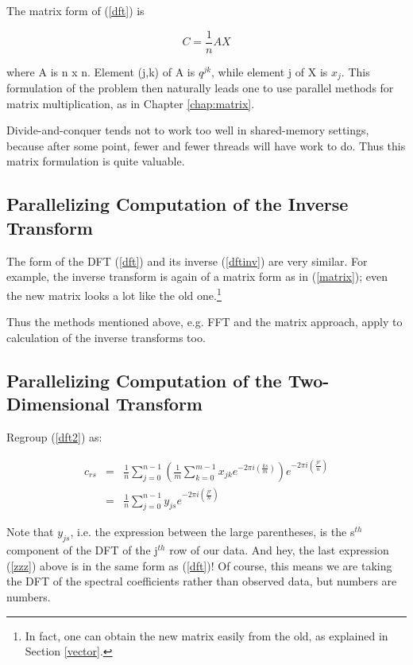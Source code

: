 The matrix form of (\ref{dft}) is

\begin{equation}
\label{matrix}
C = \frac{1}{n} A X
\end{equation}

where A is n x n.  Element (j,k) of A is $q^{jk}$, while
element j of X is $x_j$.  This formulation of the problem then naturally
leads one to use parallel methods for matrix multiplication, as in 
Chapter \ref{chap:matrix}.

Divide-and-conquer tends not to work too well in shared-memory settings,
because after some point, fewer and fewer threads will have work to do.
Thus this matrix formulation is quite valuable.

\subsection{Parallelizing Computation of the Inverse Transform}  

The form of the DFT (\ref{dft}) and its inverse (\ref{dftinv}) are very
similar.  For example, the inverse transform is again of a matrix form
as in (\ref{matrix}); even the new matrix looks a lot like the old 
one.\footnote{In fact, one can obtain the new matrix easily from the
old, as explained in Section \ref{vector}.}

Thus the methods mentioned above, e.g. FFT and the matrix approach,
apply to calculation of the inverse transforms too.

\subsection{Parallelizing Computation of the Two-Dimensional Transform}
\label{par2d}

Regroup (\ref{dft2}) as:

\begin{eqnarray}
\label{dft2new}
c_{rs} &=& 
\frac{1}{n} 
\sum_{j=0}^{n-1}
\left (
\frac{1}{m}
\sum_{k=0}^{m-1}
x_{jk} e^{-2\pi i(\frac{ks}{m})}
\right )
e^{-2\pi i(\frac{jr}{n})} \\
&=&
\label{zzz}
\frac{1}{n}
\sum_{j=0}^{n-1}
y_{js}
e^{-2\pi i(\frac{jr}{n})}
\end{eqnarray}

Note that $y_{js}$, i.e. the expression between the large parentheses,
is the s$^{th}$ component of the DFT of the j$^{th}$ row of our data.
And hey, the last expression (\ref{zzz}) above is in the same form as
(\ref{dft})!  Of course, this means we are taking the DFT of the
spectral coefficients rather than observed data, but numbers are
numbers.  

